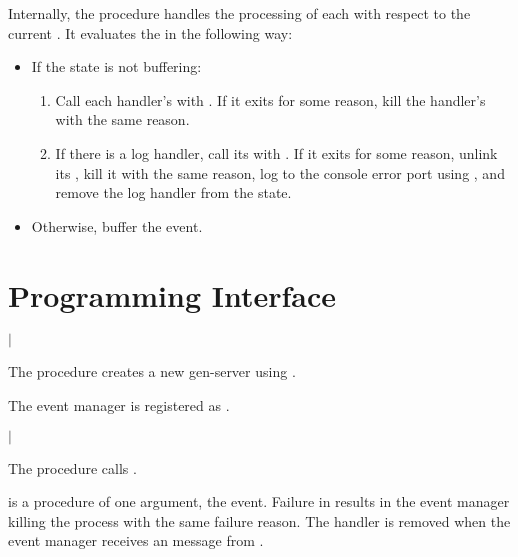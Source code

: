 Internally, the  procedure
handles the processing of each  with respect to the current
. It evaluates the  in the following way:

\antipar
\begin{itemize}
  \item If the state is not buffering:
    \begin{enumerate}
    \item Call each handler's  with . If it exits
      for some reason, kill the handler's  with the same
      reason.

    \item If there is a log handler, call its  with
      . If it exits for some reason, unlink its
      , kill it with the same reason, log  to
      the console error port using , and
      remove the log handler from the state.
    \end{enumerate}

  \item Otherwise, buffer the event.
\end{itemize}

\section {Programming Interface}

\begin{procedure}
\end{procedure}
\returns{}
 $|$

The  procedure creates a new
 gen-server using .

The event manager is registered as .

\begin{procedure}
\end{procedure}
\returns{}  $|$ 

The  procedure calls
.

 is a procedure of one argument, the event. Failure in
 results in the event manager killing the 
process with the same failure reason. The handler is removed when the
event manager receives an  message from .

